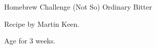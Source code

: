 \begin{recipe}{Homebrew Challenge (Not So) Ordinary Bitter}

\begin{aboutblock}
Recipe by Martin Keen.
\sourcehomebrewchallenge
\end{aboutblock}


\begin{methodandtiming}

\begin{mashsteps}
\end{mashsteps}

\begin{fermentationsteps}
\end{fermentationsteps}

\begin{directions}
Age for 3 weeks.
\end{directions}

\end{methodandtiming}

\recipebreak

\begin{ingredientsblock}

\begin{malts}
\end{malts}

\begin{hops}
\end{hops}


\end{ingredientsblock}

\end{recipe}
